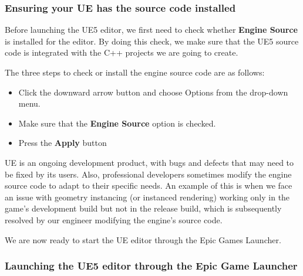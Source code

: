 \documentclass[11pt]{article} %
\begin{document}
\subsubsection*{Ensuring your UE has the source code installed}

Before launching the UE5 editor, we first need to check whether \textbf{Engine Source} is installed for the editor. By doing this check, we make sure that the UE5 source code is integrated with the C++ projects we are going to create.

The three steps to check or install the engine source code are as follows:

\begin{itemize}
\item Click the downward arrow button and choose Options from the drop-down menu.
\item Make sure that the \textbf{Engine Source} option is checked.
\item Press the \textbf{Apply} button
\end{itemize}

UE is an ongoing development product, with bugs and defects that may need to be fixed by its users. Also, professional developers sometimes modify the engine source code to adapt to their specific needs. An example of this is when we face an issue with geometry instancing (or instanced rendering) working only in the game’s development build but not in the release build, which is subsequently resolved by our engineer modifying the engine’s source code.

\begin{center}
\end{center}

We are now ready to start the UE editor through the Epic Games Launcher.

\subsubsection*{Launching the UE5 editor through the Epic Game Launcher}
\end{document}
